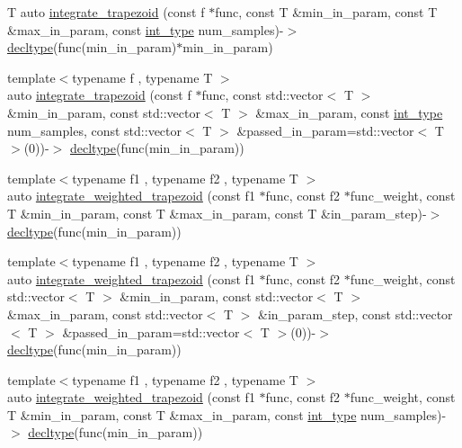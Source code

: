 \begin{DoxyCompactItemize}
\item 
T auto \hyperlink{namespaceIceBRG_a15a1759738b2a5b0d322185709994d2d}{integrate\-\_\-trapezoid} (const f $\ast$func, const T \&min\-\_\-in\-\_\-param, const T \&max\-\_\-in\-\_\-param, const \hyperlink{lib_2IceBRG__main_2common_8h_ac4de9d9335536ac22821171deec8d39e}{int\-\_\-type} num\-\_\-samples)-\/$>$ \hyperlink{namespaceIceBRG_a528e5024ecab03049320529180ae84a8}{decltype}(func(min\-\_\-in\-\_\-param)$\ast$min\-\_\-in\-\_\-param)
\item 
{\footnotesize template$<$typename f , typename T $>$ }\\auto \hyperlink{namespaceIceBRG_a70acf6f27f4e427fecf63a63bc9b7956}{integrate\-\_\-trapezoid} (const f $\ast$func, const std\-::vector$<$ T $>$ \&min\-\_\-in\-\_\-param, const std\-::vector$<$ T $>$ \&max\-\_\-in\-\_\-param, const \hyperlink{lib_2IceBRG__main_2common_8h_ac4de9d9335536ac22821171deec8d39e}{int\-\_\-type} num\-\_\-samples, const std\-::vector$<$ T $>$ \&passed\-\_\-in\-\_\-param=std\-::vector$<$ T $>$(0))-\/$>$ \hyperlink{namespaceIceBRG_a528e5024ecab03049320529180ae84a8}{decltype}(func(min\-\_\-in\-\_\-param))
\item 
{\footnotesize template$<$typename f1 , typename f2 , typename T $>$ }\\auto \hyperlink{namespaceIceBRG_ad1898a609bb2c9fc5de836d74d6bf7c5}{integrate\-\_\-weighted\-\_\-trapezoid} (const f1 $\ast$func, const f2 $\ast$func\-\_\-weight, const T \&min\-\_\-in\-\_\-param, const T \&max\-\_\-in\-\_\-param, const T \&in\-\_\-param\-\_\-step)-\/$>$ \hyperlink{namespaceIceBRG_a528e5024ecab03049320529180ae84a8}{decltype}(func(min\-\_\-in\-\_\-param))
\item 
{\footnotesize template$<$typename f1 , typename f2 , typename T $>$ }\\auto \hyperlink{namespaceIceBRG_aa74f29c2c49652e29ab9646b20e357fe}{integrate\-\_\-weighted\-\_\-trapezoid} (const f1 $\ast$func, const f2 $\ast$func\-\_\-weight, const std\-::vector$<$ T $>$ \&min\-\_\-in\-\_\-param, const std\-::vector$<$ T $>$ \&max\-\_\-in\-\_\-param, const std\-::vector$<$ T $>$ \&in\-\_\-param\-\_\-step, const std\-::vector$<$ T $>$ \&passed\-\_\-in\-\_\-param=std\-::vector$<$ T $>$(0))-\/$>$ \hyperlink{namespaceIceBRG_a528e5024ecab03049320529180ae84a8}{decltype}(func(min\-\_\-in\-\_\-param))
\item 
{\footnotesize template$<$typename f1 , typename f2 , typename T $>$ }\\auto \hyperlink{namespaceIceBRG_a670f934b369725e1717d370976901793}{integrate\-\_\-weighted\-\_\-trapezoid} (const f1 $\ast$func, const f2 $\ast$func\-\_\-weight, const T \&min\-\_\-in\-\_\-param, const T \&max\-\_\-in\-\_\-param, const \hyperlink{lib_2IceBRG__main_2common_8h_ac4de9d9335536ac22821171deec8d39e}{int\-\_\-type} num\-\_\-samples)-\/$>$ \hyperlink{namespaceIceBRG_a528e5024ecab03049320529180ae84a8}{decltype}(func(min\-\_\-in\-\_\-param))

\end{DoxyCompactItemize}
